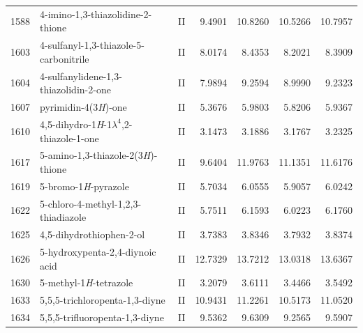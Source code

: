\begin{longtable}{rlcd{2.5}d{2.5}d{2.5}d{2.5}}
    1588 & 4-imino-1,3-thiazolidine-2-thione                      & II & 9.4901  & 10.8260 & 10.5266 & 10.7957 \\
    1603 & 4-sulfanyl-1,3-thiazole-5-carbonitrile                 & II & 8.0174  & 8.4353  & 8.2021  & 8.3909  \\
    1604 & 4-sulfanylidene-1,3-thiazolidin-2-one                  & II & 7.9894  & 9.2594  & 8.9990  & 9.2323  \\
    1607 & pyrimidin-4(3\textit{H})-one                           & II & 5.3676  & 5.9803  & 5.8206  & 5.9367  \\
    1610 & 4,5-dihydro-1\textit{H}-1$\lambda^4$,2-thiazole-1-one  & II & 3.1473  & 3.1886  & 3.1767  & 3.2325  \\
    1617 & 5-amino-1,3-thiazole-2(3\textit{H})-thione             & II & 9.6404  & 11.9763 & 11.1351 & 11.6176 \\
    1619 & 5-bromo-1\textit{H}-pyrazole                           & II & 5.7034  & 6.0555  & 5.9057  & 6.0242  \\
    1622 & 5-chloro-4-methyl-1,2,3-thiadiazole                    & II & 5.7511  & 6.1593  & 6.0223  & 6.1760  \\
    1625 & 4,5-dihydrothiophen-2-ol                               & II & 3.7383  & 3.8346  & 3.7932  & 3.8374  \\
    1626 & 5-hydroxypenta-2,4-diynoic   acid                      & II & 12.7329 & 13.7212 & 13.0318 & 13.6367 \\
    1630 & 5-methyl-1\textit{H}-tetrazole                         & II & 3.2079  & 3.6111  & 3.4466  & 3.5492  \\
    1633 & 5,5,5-trichloropenta-1,3-diyne                         & II & 10.9431 & 11.2261 & 10.5173 & 11.0520 \\
    1634 & 5,5,5-trifluoropenta-1,3-diyne                         & II & 9.5362  & 9.6309  & 9.2565  & 9.5907 
\end{longtable}

\endgroup